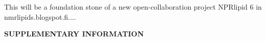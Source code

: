 \documentclass[aip,jcp,twocolumn]{revtex4}
\begin{document}
This will be a foundation stone of a new open-collaboration project NPRlipid 6 in nmrlipids.blogspot.fi....


%

\begin{acknowledgments}
\end{acknowledgments}
\newpage
\appendix
\begin{center}
{\bf SUPPLEMENTARY INFORMATION}
\end{center}





\listoftodos
\end{document}
